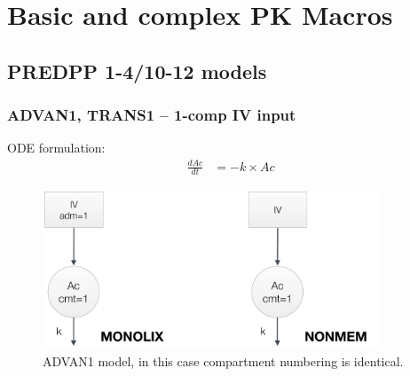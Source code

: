 \chapter{Basic and complex PK Macros}
\label{sec:PKMacrosAppendix}

\section{PREDPP 1-4/10-12 models}

\subsection{ADVAN1, TRANS1 -- 1-comp IV input}
\label{subsubsec:ADVAN1}
ODE formulation:
\begin{align}
\frac{dAc}{dt} &= - k \times Ac  \nonumber
\end{align}


\begin{figure}[htbp!]
\centering
 \includegraphics[width=100mm]{pics/Advan1}
\caption{ADVAN1 model, in this case compartment numbering is identical.}
\label{fig:Advan1}
\end{figure}

